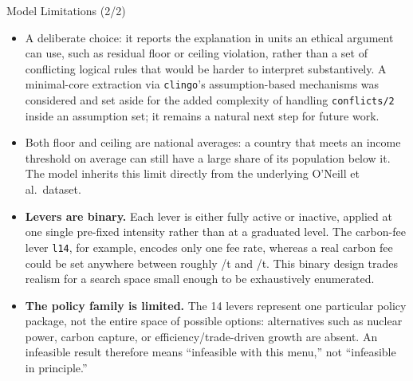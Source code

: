 \documentclass[11pt,aspectratio=169]{beamer}
\begin{document}
\begin{frame}{Model Limitations (2/2)}
  \footnotesize
  \begin{itemize}
    \item A deliberate choice: it reports the explanation in units an ethical argument can use, such as residual floor or ceiling violation, rather than a set of conflicting logical rules that would be harder to interpret substantively. A minimal-core extraction via \texttt{clingo}'s assumption-based mechanisms was considered and set aside for the added complexity of handling \texttt{conflicts/2} inside an assumption set; it remains a natural next step for future work.
    \item Both floor and ceiling are national averages: a country that meets an income threshold on average can still have a large share of its population below it. The model inherits this limit directly from the underlying O'Neill et al.\ dataset.
    \item \textbf{Levers are binary.} Each lever is either fully active or inactive, applied at one single pre-fixed intensity rather than at a graduated level. The carbon-fee lever \texttt{l14}, for example, encodes only one fee rate, whereas a real carbon fee could be set anywhere between roughly /t and /t. This binary design trades realism for a search space small enough to be exhaustively enumerated.
    \item \textbf{The policy family is limited.} The 14 levers represent one particular policy package, not the entire space of possible options: alternatives such as nuclear power, carbon capture, or efficiency/trade-driven growth are absent. An infeasible result therefore means \alert{``infeasible with this menu,''} not ``infeasible in principle.''
  \end{itemize}
\end{frame}
\end{document}
